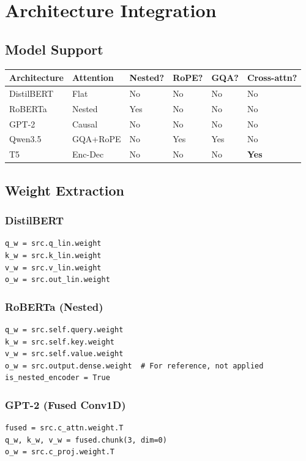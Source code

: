 \section{Architecture Integration}

\subsection{Model Support}

\begin{table}[H]
\centering
\small
\begin{tabular}{llllll}
\toprule
\textbf{Architecture} & \textbf{Attention} & \textbf{Nested?} & \textbf{RoPE?} & \textbf{GQA?} & \textbf{Cross-attn?} \\
\midrule
DistilBERT & Flat & No & No & No & No \\
RoBERTa & Nested & Yes & No & No & No \\
GPT-2 & Causal & No & No & No & No \\
Qwen3.5 & GQA+RoPE & No & Yes & Yes & No \\
T5 & Enc-Dec & No & No & No & \textbf{Yes} \\
\bottomrule
\end{tabular}
\end{table}

\subsection{Weight Extraction}

\subsubsection{DistilBERT}
\begin{lstlisting}
q_w = src.q_lin.weight
k_w = src.k_lin.weight
v_w = src.v_lin.weight
o_w = src.out_lin.weight
\end{lstlisting}

\subsubsection{RoBERTa (Nested)}
\begin{lstlisting}
q_w = src.self.query.weight
k_w = src.self.key.weight
v_w = src.self.value.weight
o_w = src.output.dense.weight  # For reference, not applied
is_nested_encoder = True
\end{lstlisting}

\subsubsection{GPT-2 (Fused Conv1D)}
\begin{lstlisting}
fused = src.c_attn.weight.T
q_w, k_w, v_w = fused.chunk(3, dim=0)
o_w = src.c_proj.weight.T
\end{lstlisting}

